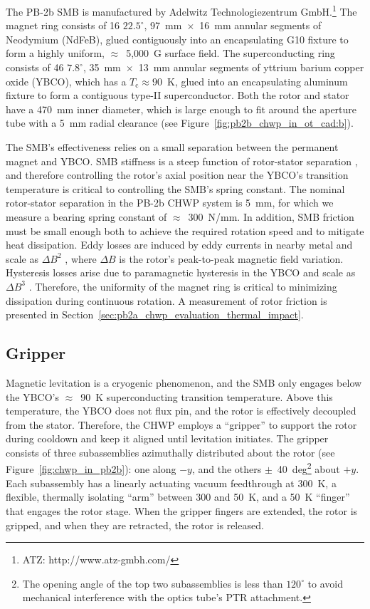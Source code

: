 The PB-2b SMB is manufactured by Adelwitz Technologiezentrum GmbH.\footnote{ATZ: http://www.atz-gmbh.com/} The magnet ring consists of 16 $22.5^{\circ}$, 97~mm~$\times$~16~mm annular segments of Neodymium (NdFeB), glued contiguously into an encapsulating G10 fixture to form a highly uniform, $\approx$~5,000~G surface field. The superconducting ring consists of 46 $7.8^{\circ}$, 35~mm~$\times$~13~mm annular segments of yttrium barium copper oxide (YBCO), which has a $T_{\mathrm{c}} \approx 90$~K, glued into an encapsulating aluminum fixture to form a contiguous type-II superconductor. Both the rotor and stator have a 470~mm inner diameter, which is large enough to fit around the aperture tube with a 5~mm radial clearance (see Figure~\ref{fig:pb2b_chwp_in_ot_cad:b}).

The SMB's effectiveness relies on a small separation between the permanent magnet and YBCO. SMB stiffness is a steep function of rotor-stator separation \cite{hull_effect_2000}, and therefore controlling the rotor's axial position near the YBCO's transition temperature is critical to controlling the SMB's spring constant. The nominal rotor-stator separation in the PB-2b CHWP system is 5~mm, for which we measure a bearing spring constant of $\approx$~300~N/mm. In addition, SMB friction must be small enough both to achieve the required rotation speed and to mitigate heat dissipation. Eddy losses are induced by eddy currents in nearby metal and scale as $\Delta B^{2}$ \cite{bean_magnetization_1964}, where $\Delta B$ is the rotor's peak-to-peak magnetic field variation. Hysteresis losses arise due to paramagnetic hysteresis in the YBCO and scale as $\Delta B^{3}$ \cite{zeisberger_losses_1998}. Therefore, the uniformity of the magnet ring is critical to minimizing dissipation during continuous rotation. A measurement of rotor friction is presented in Section~\ref{sec:pb2a_chwp_evaluation_thermal_impact}.


\subsection{Gripper}
\label{sec:gripper_design}

Magnetic levitation is a cryogenic phenomenon, and the SMB only engages below the YBCO's $\approx$~90~K superconducting transition temperature. Above this temperature, the YBCO does not flux pin, and the rotor is effectively decoupled from the stator. Therefore, the CHWP employs a ``gripper'' to support the rotor during cooldown and keep it aligned until levitation initiates. The gripper consists of three subassemblies azimuthally distributed about the rotor (see Figure~\ref{fig:chwp_in_pb2b}): one along $-y$, and the others $\pm$~40~deg\footnote{The opening angle of the top two subassemblies is less than $120^{\circ}$ to avoid mechanical interference with the optics tube's PTR attachment.} about $+y$. Each subassembly has a linearly actuating vacuum feedthrough at 300~K, a flexible, thermally isolating ``arm'' between 300 and 50~K, and a 50~K ``finger'' that engages the rotor stage.  When the gripper fingers are extended, the rotor is gripped, and when they are retracted, the rotor is released.

